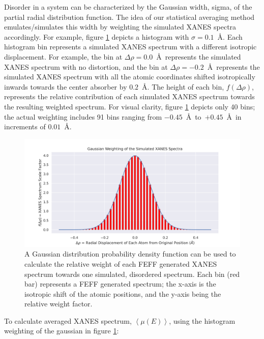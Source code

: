 Disorder in a system can be characterized by the Gaussian width, sigma, of the partial radial distribution function. The idea of our statistical averaging method emulates/simulates this width by weighting the simulated XANES spectra accordingly. For example, figure \ref{fig:gaussian-weighting-hist} depicts a histogram with $ \sigma=0.1 $~\AA. Each histogram bin represents a simulated XANES spectrum with a different isotropic displacement. For example, the bin at $ \Delta\rho=0.0 $~\AA~represents the simulated XANES spectrum with no distortion, and the bin at $ \Delta\rho=-0.2 $~\AA~represents the simulated XANES spectrum with all the atomic coordinates shifted isotropically inwards towards the center absorber by $ 0.2 $~\AA. The height of each bin, $ f(\Delta\rho) $, represents the relative contribution of each simulated XANES spectrum towards the resulting weighted spectrum. For visual clarity, figure \ref{fig:gaussian-weighting-hist} depicts only 40 bins; the actual weighting includes 91 bins ranging from $ -0.45 $~\AA~to~$ +0.45 $~\AA~in increments of $ 0.01 $~\AA. 

\begin{figure}[h!]
	\centering
	\includegraphics[width=\linewidth]{Chapters/Figures/gaussian-weighting-hist.png}
	\caption[Simulated Spectrum Gaussian Weighting]{A Gaussian distribution probability density function can be used to calculate the relative weight of each FEFF generated XANES spectrum towards one simulated, disordered spectrum. Each bin (red bar) represents a FEFF generated spectrum; the x-axis is the isotropic shift of the atomic positions, and the y-axis being the relative weight factor.}
	\label{fig:gaussian-weighting-hist}
\end{figure}

To calculate averaged XANES spectrum, $ \left\langle \mu(E) \right\rangle $, using the histogram weighting of the gaussian in figure \ref{fig:gaussian-weighting-hist}:

